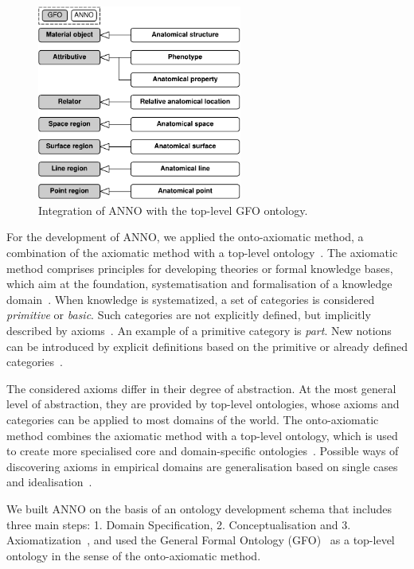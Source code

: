 \documentclass[sw]{iosart2x}
\begin{document}
\fi
\begin{figure}[h]
\includegraphics[width=0.6\textwidth]{img/gfo.pdf}
\caption{Integration of ANNO with the top-level GFO ontology.}\label{fig:gfo}
\end{figure}

For the development of ANNO, we applied the onto-axiomatic method, a combination of the axiomatic method with a top-level ontology~\citep{baumann2014, herre2010}.
The axiomatic method comprises principles for developing theories or formal knowledge bases, which aim at the foundation, systematisation and formalisation of a knowledge domain~\citep{baumann2014, herre2010}.
When knowledge is systematized, a set of categories is considered \emph{primitive} or \emph{basic}.
Such categories are not explicitly defined, but implicitly described by axioms~\citep{Hilbert1918}.
An example of a primitive category is \emph{part}.
New notions can be introduced by explicit definitions based on the primitive or already defined categories~\citep{herre2010}.

The considered axioms differ in their degree of abstraction.
At the most general level of abstraction, they are provided by top-level ontologies, whose axioms and categories can be applied to most domains of the world.
The onto-axiomatic method combines the axiomatic method with a top-level ontology, which is used to create more specialised core and domain-specific ontologies~\citep{baumann2014}.
Possible ways of discovering axioms in empirical domains are generalisation based on single cases and idealisation~\citep{baumann2011}.

We built ANNO on the basis of an ontology development schema that includes three main steps: 1. Domain Specification, 2. Conceptualisation and 3. Axiomatization~\citep{herre2010}, and used the General Formal Ontology (GFO)~\citep{Loebe2022, Burek2020, herre2010} as a top-level ontology in the sense of the onto-axiomatic method.
\end{document}
